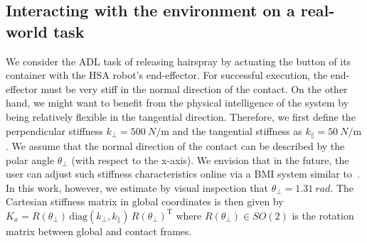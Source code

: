 \documentclass[letterpaper, 10pt, conference]{ieeeconf}      %
\begin{document}
\subsection{Interacting with the environment on a real-world task}\label{sub:braincontrol:experiments:adl}
We consider the \gls{ADL} task of releasing hairspray by actuating the button of its container with the \gls{HSA} robot's end-effector. For successful execution, the end-effector must be very stiff in the normal direction of the contact. On the other hand, we might want to benefit from the physical intelligence of the system by being relatively flexible in the tangential direction. Therefore, we first define the perpendicular stiffness $k_\perp = \SI{500}{N\per\meter}$ and the tangential stiffness as $k_\parallel = \SI{50}{N \per \meter}$. We assume that the normal direction of the contact can be described by the polar angle $\theta_\perp$ (with respect to the x-axis). We envision that in the future, the user can adjust such stiffness characteristics online via a \gls{BMI} system similar to~\cite{schiatti2017soft}. In this work, however, we estimate by visual inspection that $\theta_\perp=\SI{1.31}{rad}$.
The Cartesian stiffness matrix in global coordinates is then given by $K_x = R(\theta_\perp) \, \mathrm{diag}(k_\perp, k_\parallel) \, R(\theta_\perp)^\mathrm{T}$
where $R(\theta_\perp) \in SO(2)$ is the rotation matrix between global and contact frames.
\end{document}
